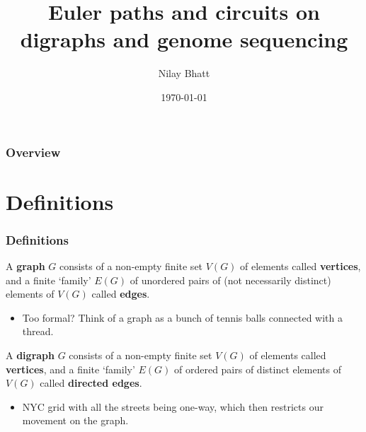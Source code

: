 \documentclass{beamer}
\title[Euler paths and circuits on digraphs and genome sequencing]{Euler paths and circuits on digraphs and genome sequencing} %
\author{Nilay Bhatt} %
\institute[CCSU] %
{
Central Connecticut State University \\ %
\medskip
\textit{nilaybhatt@my.ccsu.edu} %
}
\date{\today} %
\begin{document}
\begin{frame}	
\titlepage %
\end{frame}

\begin{frame}
\frametitle{Overview} %
\tableofcontents %
\end{frame}


\section{Definitions} 
\begin{frame}
\frametitle{Definitions}
\begin{definition}[Graph]
A \textbf{graph} $G$ consists of a non-empty finite set $V(G)$ of elements called \textbf{vertices},
and a finite `family'  $ E(G)$ of unordered pairs of (not necessarily distinct) elements
of $V(G)$ called \textbf{edges}.
\end{definition}
\pause
\begin{itemize}
\item Too formal? Think of a graph as a bunch of tennis balls connected with a thread.
\end{itemize}
\pause
\begin{definition}[Digraph]
A \textbf{digraph} $G$ consists of a non-empty finite set $V(G)$ of elements called \textbf{vertices},
and a finite `family'  $E(G)$ of ordered pairs of distinct elements of $V(G)$ called \textbf{directed edges}.
\end{definition}
\pause
\begin{itemize}
\item NYC grid with all the streets being one-way, which then restricts our movement on the graph.
\end{itemize}
\end{frame}
\end{document}
